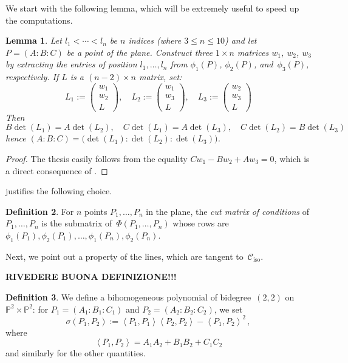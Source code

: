 \documentclass{amsart}
\theoremstyle{plain}
\newtheorem{lemma}{Lemma}[section]
\theoremstyle{definition}
\newtheorem{definition}[lemma]{Definition}
\newcommand{\p}{\mathbb{P}}
\newcommand{\iso}{\mathcal{C}_{\mathrm{iso}}}
\newcommand{\scl}[2]{\left\langle {#1}, {#2} \right\rangle}
\begin{document}
We start with the following lemma, which will be extremely useful
to speed up the computations.

\begin{lemma}
\label{lemma:minors}
Let $l_1 < \cdots <l_n$ be $n$ indices (where $3 \leq n \leq 10$) and let $P = (A: B: C)$ be a point of the plane.
Construct three $1 \times n$ matrices $w_1$, $w_2$, $w_3$ by extracting the entries of position $l_1, \dotsc, l_n$ from $\phi_1(P)$, $\phi_2(P)$, and~$\phi_3(P)$, respectively. If $L$ is a $(n-2) \times n$ matrix, set:
  \[
  L_1 := \left(\begin{array}{c}w_1 \\ w_2 \\ L\end{array}  \right), \quad
  L_2 := \left(\begin{array}{c}w_1 \\ w_3 \\ L\end{array}  \right), \quad
  L_3 := \left(\begin{array}{c}w_2 \\ w_3 \\ L\end{array}  \right)
  \]
  Then
  \[
  B \det(L_1) = A \det(L_2), \quad
  C \det(L_1) = A \det(L_3), \quad
  C \det(L_2) = B \det(L_3)
  \]
  hence $(A: B: C) = \bigl( \det(L_1): \det(L_2): \det(L_3) \bigr)$.
\end{lemma}
\begin{proof}
  The thesis easily follows from the equality $C w_1 - B w_2 + A w_3 = 0$, which is a direct consequence of .
\end{proof}

 justifies the following choice.

\begin{definition}
 \label{definition:reduced_matrix_conditions}
 For $n$ points $P_1, \dotsc, P_n$ in the plane, the \emph{cut matrix of conditions} of $P_1, \dotsc, P_n$ is the submatrix of~$\Phi(P_1, \dotsc, P_n)$ whose rows are $\phi_1(P_1), \phi_2(P_1), \dotsc, \phi_1(P_n), \phi_2(P_n)$.
\end{definition}

Next, we point out a property of the lines, which are tangent to~$\iso$.

\textbf{RIVEDERE BUONA DEFINIZIONE!!!}
\begin{definition}
\label{definition:sigma}
We define a bihomogeneous polynomial of bidegree~$(2,2)$ on $\p^2 \times \p^2$: for $P_1 = (A_1: B_1: C_1)$ and $P_2 = (A_2: B_2: C_2)$, we set
%
\[
  \sigma(P_1, P_2) := \scl{P_1}{P_1} \scl{P_2}{P_2} - \scl{P_1}{P_2}^2 \,,
\]
%
where
%
\[
 \scl{P_1}{P_2} = A_1 A_2 + B_1 B_2 + C_1 C_2
\]
%
and similarly for the other quantities.
\end{definition}
\end{document}
